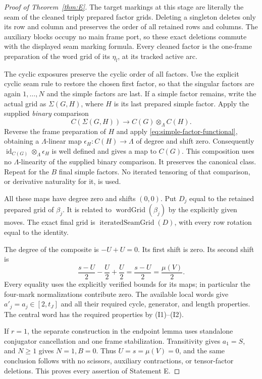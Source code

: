\documentclass[11pt,a4paper]{article}
\theoremstyle{remark}
\begin{document}
\begin{proof}[Proof of Theorem~\ref{thm:E}]
The target markings at this stage are literally the seam of the
cleaned triply prepared factor grids.  Deleting a singleton deletes
only its row and column and preserves the order of all retained
rows and columns.  The auxiliary blocks occupy no main frame port,
so these exact deletions commute with the displayed seam marking
formula.  Every cleaned factor is the one-frame preparation of the
word grid of its $\eta_l$, at its tracked active arc.

The cyclic exposures preserve the cyclic order of all factors.
Use the explicit cyclic seam rule to restore the chosen first factor,
so that the singular factors are again $1,\ldots,N$ and the simple
factors are last.  If a simple factor remains, write the actual grid
as $\Sigma(G,H)$, where $H$ is its last prepared simple factor.
Apply the supplied \emph{binary} comparison
\[
 C(\Sigma(G,H))\longrightarrow C(G)\otimes_\Lambda C(H).
\]
Reverse the frame preparation of $H$ and apply
\eqref{eq:simple-factor-functional}, obtaining a $\Lambda$-linear
map $\epsilon_H:C(H)\to\Lambda$ of degree and shift zero.
Consequently $\operatorname{id}_{C(G)}\otimes_\Lambda\epsilon_H$
is well defined and gives a map to $C(G)$.  This composition uses
no $\Lambda$-linearity of the supplied binary comparison.  It
preserves the canonical class.  Repeat for the $B$ final simple
factors.  No iterated tensoring of that comparison, or derivative
naturality for it, is used.

All these maps have degree zero and shifts $(0,0)$.  Put $D_j$ equal
to the retained prepared grid of
$\beta_j$.  It is related to $\operatorname{wordGrid}(\beta_j)$
by the explicitly given moves.  The exact final grid is
$\operatorname{iteratedSeamGrid}(D)$, with every row rotation equal
to the identity.

The degree of the composite is $-U+U=0$.  Its first shift is zero.
Its second shift is
\[
 \frac{s-U}{2}-\frac U2+\frac U2
     =\frac{s-U}{2}
     =\frac{\mu(V)}2.
\]
Every equality uses the explicitly verified bounds for its maps;
in particular the four-mark normalizations contribute zero.
The available local words give $a'_j=a_j\in[2,t_J]$ and all their
required cycle, generator, and length properties.  The central
word has the required properties by (I1)--(I2).

If $r=1$, the separate construction in the endpoint lemma uses
standalone conjugator cancellation and one frame stabilization.
Transitivity gives $a_1=S$, and $N\ge1$ gives $N=1,B=0$.
Thus $U=s=\mu(V)=0$, and the same conclusion follows with no
scissors, auxiliary contractions, or tensor-factor deletions.
This proves every assertion of Statement E.
\end{proof}
\end{document}
